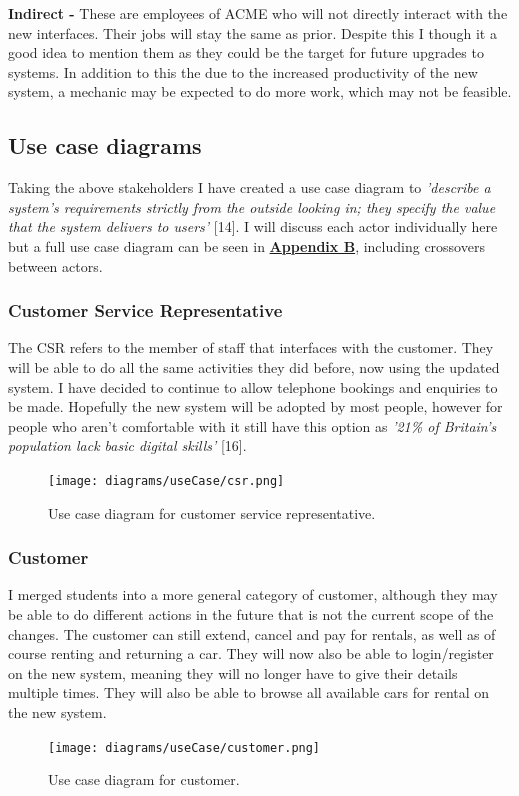     \vspace{0.2cm}

    \noindent\textbf{Indirect -} These are employees of ACME who will not directly interact with the new interfaces. Their jobs will stay the same as prior. Despite
    this I though it a good idea to mention them as they could be the target for future upgrades to systems. In addition to this the due to the increased 
    productivity of the new system, a mechanic may be expected to do more work, which may not be feasible.

  \subsection{Use case diagrams}
    Taking the above stakeholders I have created a use case diagram to \textit{'describe a system's requirements strictly from the outside looking in;
    they specify the value that the system delivers to users'} [14]. I will discuss each actor individually here but a full
    use case diagram can be seen in \hyperref[sec:AppendixB]{\textbf{Appendix B}}, including crossovers between actors.

    \subsubsection{Customer Service Representative}
      The CSR refers to the member of staff that interfaces with the customer. They will be able to do all the same activities they did before, now using
      the updated system. I have decided to continue to allow telephone bookings and enquiries to be made. Hopefully the new system will be
      adopted by most people, however for people who aren't comfortable with it still have this option as  
      \textit{'21\% of Britain's population lack basic digital skills'} [16].
      \begin{figure}[H]
        \centering
        \texttt{[image: diagrams/useCase/csr.png]}
        \caption{Use case diagram for customer service representative.}
        \label{fig:UCcsr}
      \end{figure}

    \subsubsection{Customer}
      I merged students into a more general category of customer, although they may be able to do different actions in the future that is not the current 
      scope of the changes. The customer can still extend, cancel and pay for rentals, as well as of course renting and returning a car.
      They will now also be able to login/register on the new system, meaning they will no longer have to give their details multiple times. They will also 
      be able to browse all available cars for rental on the new system.  
      \begin{figure}[H]
        \centering
        \texttt{[image: diagrams/useCase/customer.png]}
        \caption{Use case diagram for customer.}
        \label{fig:UCcustomer}
      \end{figure}
    
